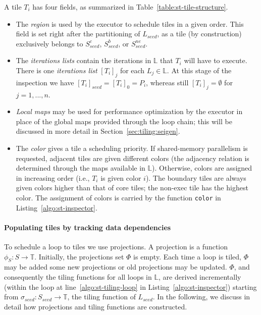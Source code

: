 A tile $T_i$ has four fields, as summarized in Table~\ref{table:st-tile-structure}. 

\begin{itemize}
\item The {\em region} is used by the executor to schedule tiles in a given order. This field is set right after the partitioning of $L_{seed}$, as a tile (by construction) exclusively belongs to $S_{seed}^c$, $S_{seed}^b$, or $S_{seed}^{ne}$.
\item The {\em iterations lists} contain the iterations in $\mathbb{L}$ that $T_i$ will have to execute. There is one {\em iterations list} $[T_i]_j$ for each $L_j \in \mathbb{L}$. At this stage of the inspection we have $[T_i]_{seed} = [T_i]_0 = P_i$, whereas still $[T_i]_j = \emptyset$ for $j=1,...,n$.
\item {\em Local maps} may be used for performance optimization by the executor in place of the global maps provided through the loop chain; this will be discussed in more detail in Section~\ref{sec:tiling:seigen}.
\item The {\em color} gives a tile a scheduling priority. If shared-memory parallelism is requested, adjacent tiles are given different colors (the adjacency relation is determined through the maps available in $\mathbb{L}$). Otherwise, colors are assigned in increasing order (i.e., $T_i$ is given color $i$). The boundary tiles are always given colors higher than that of core tiles; the non-exec tile has the highest color. The assignment of colors is carried by the function {\tt color} in Listing~\ref{algo:st-inspector}.
\end{itemize}



\paragraph{Populating tiles by tracking data dependencies}
To schedule a loop to tiles we use projections. A projection is a function $\phi_S : S \rightarrow \mathbb{T}$. Initially, the projections set $\Phi$ is empty. Each time a loop is tiled, $\Phi$ may be added some new projections or old projections may be updated. $\Phi$, and consequently the tiling functions for all loops in $\mathbb{L}$, are derived incrementally (within the loop at line~\ref{algo:st-tiling-loop} in Listing~\ref{algo:st-inspector}) starting from $\sigma_{seed} : S_{seed} \rightarrow \mathbb{T}$, the tiling function of $L_{seed}$. In the following, we discuss in detail how projections and tiling functions are constructed. 


